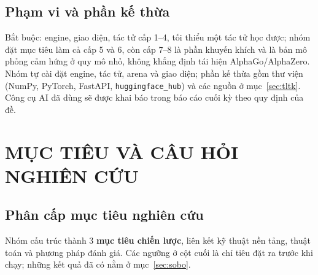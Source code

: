 \documentclass[12pt,a4paper]{report}
\begin{document}
\subsection{Phạm vi và phần kế thừa}
Bắt buộc: engine, giao diện, tác tử cấp 1--4, tối thiểu một tác tử học được; nhóm đặt mục tiêu làm cả cấp 5 và 6, còn cấp 7--8 là phần khuyến khích và là bản mô phỏng cảm hứng ở quy mô nhỏ, không khẳng định tái hiện AlphaGo/AlphaZero. Nhóm tự cài đặt engine, tác tử, arena và giao diện; phần kế thừa gồm thư viện (NumPy, PyTorch, FastAPI, \texttt{huggingface\_hub}) và các nguồn ở mục~\ref{sec:tltk}. Công cụ AI đã dùng sẽ được khai báo trong báo cáo cuối kỳ theo quy định của đề.

\section{MỤC TIÊU VÀ CÂU HỎI NGHIÊN CỨU}

\subsection{Phân cấp mục tiêu nghiên cứu}
Nhóm cấu trúc thành 3 \textbf{mục tiêu chiến lược}, liên kết kỹ thuật nền tảng, thuật toán và phương pháp đánh giá. Các ngưỡng ở cột cuối là chỉ tiêu đặt ra trước khi chạy; những kết quả đã có nằm ở mục~\ref{sec:sobo}.
\end{document}
